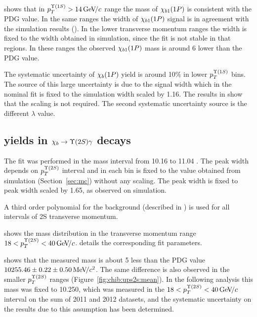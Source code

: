 


 shows that in $p_T^{\Y1S} > 14 \gevc$ range the
mass of $\chi_{b 1}(1P)$ is consistent with the PDG value. In the same ranges the
width of $\chi_{b 1}(1P)$ signal is in agreement with the simulation results
(). In the lower transverse momentum ranges the
width is fixed to the width obtained in simulation, since the fit is not stable in that
regions. In these ranges the observed $\chi_{b 1}(1P)$ mass is around 6 \mevc lower than the
PDG value.



The systematic uncertainty of $\chi_{b}(1P)$ yield is around 10\% in lower
$p_T^{\Y1S}$ bins. The source of this large uncertainty is due to the signal
width which in the nominal fit is fixed to the simulation width scaled by 1.16. 
The results in  show that the scaling is not required. 
The second systematic uncertainty source is the different $\lambda$ value.

\subsection{\texorpdfstring{\chib}{xb} yields in
    \texorpdfstring{$\chib \to \Y2S \gamma$}{xb --> Y(2S) gamma} decays}
\label{sec:chib:ups2s:fit}

The fit was performed in the mass interval from 10.16 \gevcc to 11.04 \gevcc.
The  \chiboneTwoP peak width depends on $p_T^{\Y2S}$ interval and in each bin is fixed to
the value obtained from simulation (Section~\ref{sec:mc}) without any scaling.
The \chiboneThreeP peak width is fixed to \chiboneTwoP peak width scaled by
1.65, as observed on simulation. 


A third order polynomial for the background (described in ) is used 
for all intervals of \Y2S transverse momentum.


 shows the mass distribution in the transverse
momentum range $18 < p_T^{\TwoS} < 40 \gevc$. 
details the corresponding fit parameters.




 shows that the measured \chiboneTwoP mass is
about 5 \mevcc less than the PDG value $10255.46  \pm 0.22 \pm 0.50 {\mathrm{\,Me\kern -0.1em V\!/}c^2}$.
The same difference is also observed in the smaller $p_T^{\Y2S}$ ranges
(Figure~\ref{fig:chib:ups2s:mean}).
In the following analysis this mass was fixed to 10.250\gevcc, which was measured
in the $18 < p_T^{\Y2S} < 40 \gevc$ interval on the sum of 2011 and 2012 datasets, and the
systematic uncertainty on the results due to this assumption has been
determined.

